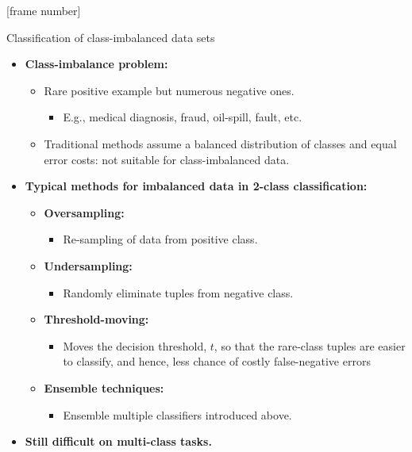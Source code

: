 \documentclass[aspectratio=169,t,table]{beamer}
\begin{document}
  {
    [frame number]
    \begin{frame}{Classification of class-imbalanced data sets}
      \begin{itemize}
        \item \textbf{Class-imbalance problem:}
        \begin{itemize}
          \item Rare positive example but numerous negative ones.
          \begin{itemize}
            \item E.g., medical diagnosis, fraud, oil-spill, fault, etc.
          \end{itemize}
          \item Traditional methods assume a balanced distribution of classes and equal error costs: not suitable for class-imbalanced data.
        \end{itemize}
        \item \textbf{Typical methods for imbalanced data in 2-class classification:}
        \begin{itemize}
          \item \textbf{\color{airforceblue}Oversampling:}
          \begin{itemize}
            \item Re-sampling of data from positive class.
          \end{itemize}
          \item \textbf{\color{airforceblue}Undersampling:}
          \begin{itemize}
            \item Randomly eliminate tuples from negative class.
          \end{itemize}
          \item \textbf{\color{airforceblue}Threshold-moving:}
          \begin{itemize}
            \item Moves the decision threshold, $t$, so that the rare-class tuples are easier to classify, and hence, less chance of costly false-negative errors
          \end{itemize}
          \item \textbf{\color{airforceblue}Ensemble techniques:}
          \begin{itemize}
            \item Ensemble multiple classifiers introduced above.
          \end{itemize}
        \end{itemize}
        \item \textbf{Still difficult on multi-class tasks.}
      \end{itemize}
    \end{frame}
  }
\end{document}
